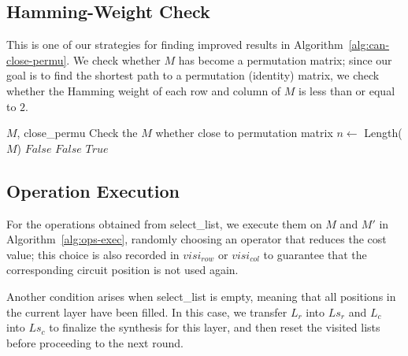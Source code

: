 \subsection{Hamming-Weight Check}

This is one of our strategies for finding improved results in Algorithm~\ref{alg:can-close-permu}. We check whether $M$ has become a permutation matrix; since our goal is to find the shortest path to a permutation (identity) matrix, we check whether the Hamming weight of each row and column of $M$ is less than or equal to $2$.

\begin{algorithm}[htbp]
\caption{Can\_Close\_Permu}
\label{alg:can-close-permu}
\begin{algorithmic}[1]
\Require $M$, close\_permu
\Ensure Check the $M$ whether close to permutation matrix
\State $n \leftarrow$ Length($M$)
		\State \Return $False$
	\EndIf
\EndFor
{}
		\State \Return $False$
	\EndIf
\EndFor
\State \Return $True$
\end{algorithmic}
\end{algorithm}

\subsection{Operation Execution}

For the operations obtained from select\_list, we execute them on $M$ and $M'$ in Algorithm~\ref{alg:ops-exec}, randomly choosing an operator that reduces the cost value; this choice is also recorded in $visi_{row}$ or $visi_{col}$ to guarantee that the corresponding circuit position is not used again.

Another condition arises when select\_list is empty, meaning that all positions in the current layer have been filled. In this case, we transfer $L_r$ into $Ls_r$ and $L_c$ into $Ls_c$ to finalize the synthesis for this layer, and then reset the visited lists before proceeding to the next round.

